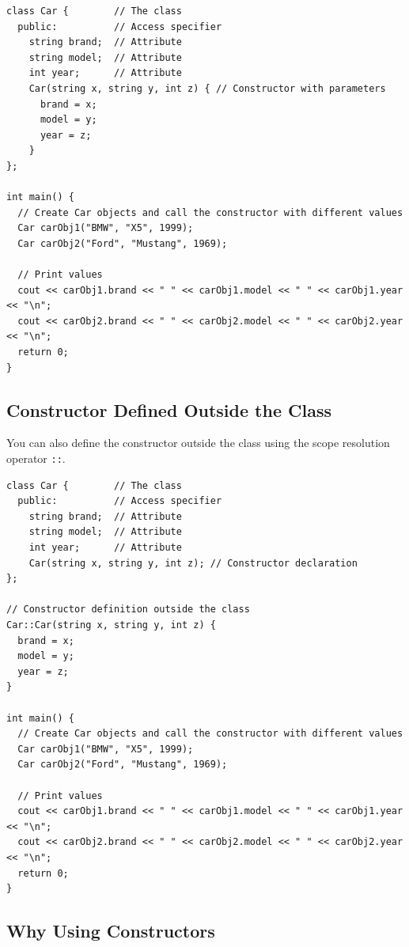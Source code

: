\documentclass[../basic_programs.tex]{subfiles}
\begin{document}
    \begin{lstlisting}[caption={caption},label=DescriptiveLabel]
class Car {        // The class
  public:          // Access specifier
    string brand;  // Attribute
    string model;  // Attribute
    int year;      // Attribute
    Car(string x, string y, int z) { // Constructor with parameters
      brand = x;
      model = y;
      year = z;
    }
};

int main() {
  // Create Car objects and call the constructor with different values
  Car carObj1("BMW", "X5", 1999);
  Car carObj2("Ford", "Mustang", 1969);

  // Print values
  cout << carObj1.brand << " " << carObj1.model << " " << carObj1.year << "\n";
  cout << carObj2.brand << " " << carObj2.model << " " << carObj2.year << "\n";
  return 0;
}
    \end{lstlisting}

    \subsection{Constructor Defined Outside the Class}

    You can also define the constructor outside the class using the scope resolution operator \lstinline|::|.

    \begin{lstlisting}[caption={caption},label=DescriptiveLabel]
class Car {        // The class
  public:          // Access specifier
    string brand;  // Attribute
    string model;  // Attribute
    int year;      // Attribute
    Car(string x, string y, int z); // Constructor declaration
};

// Constructor definition outside the class
Car::Car(string x, string y, int z) {
  brand = x;
  model = y;
  year = z;
}

int main() {
  // Create Car objects and call the constructor with different values
  Car carObj1("BMW", "X5", 1999);
  Car carObj2("Ford", "Mustang", 1969);

  // Print values
  cout << carObj1.brand << " " << carObj1.model << " " << carObj1.year << "\n";
  cout << carObj2.brand << " " << carObj2.model << " " << carObj2.year << "\n";
  return 0;
}
    \end{lstlisting}

    \subsection{Why Using Constructors}
\end{document}
